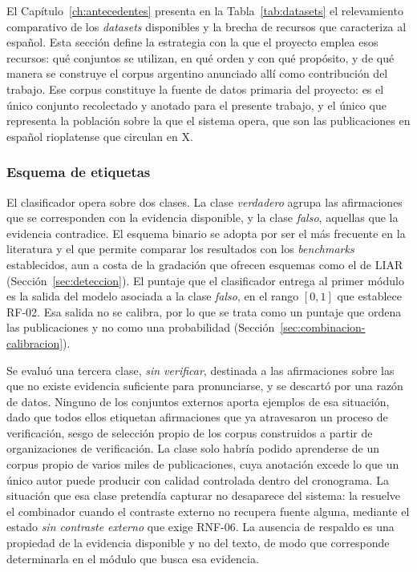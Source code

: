 El Capítulo~\ref{ch:antecedentes} presenta en la Tabla~\ref{tab:datasets} el relevamiento comparativo de los \textit{datasets} disponibles y la brecha de recursos que caracteriza al español. Esta sección define la estrategia con la que el proyecto emplea esos recursos: qué conjuntos se utilizan, en qué orden y con qué propósito, y de qué manera se construye el corpus argentino anunciado allí como contribución del trabajo. Ese corpus constituye la fuente de datos primaria del proyecto: es el único conjunto recolectado y anotado para el presente trabajo, y el único que representa la población sobre la que el sistema opera, que son las publicaciones en español rioplatense que circulan en X.

\subsubsection{Esquema de etiquetas}

El clasificador opera sobre dos clases. La clase \textit{verdadero} agrupa las afirmaciones que se corresponden con la evidencia disponible, y la clase \textit{falso}, aquellas que la evidencia contradice. El esquema binario se adopta por ser el más frecuente en la literatura y el que permite comparar los resultados con los \textit{benchmarks} establecidos, aun a costa de la gradación que ofrecen esquemas como el de LIAR (Sección~\ref{sec:deteccion}). El puntaje que el clasificador entrega al primer módulo es la salida del modelo asociada a la clase \textit{falso}, en el rango $[0,1]$ que establece RF-02. Esa salida no se calibra, por lo que se trata como un puntaje que ordena las publicaciones y no como una probabilidad (Sección~\ref{sec:combinacion-calibracion}).

Se evaluó una tercera clase, \textit{sin verificar}, destinada a las afirmaciones sobre las que no existe evidencia suficiente para pronunciarse, y se descartó por una razón de datos. Ninguno de los conjuntos externos aporta ejemplos de esa situación, dado que todos ellos etiquetan afirmaciones que ya atravesaron un proceso de verificación, sesgo de selección propio de los corpus construidos a partir de organizaciones de verificación. La clase solo habría podido aprenderse de un corpus propio de varios miles de publicaciones, cuya anotación excede lo que un único autor puede producir con calidad controlada dentro del cronograma. La situación que esa clase pretendía capturar no desaparece del sistema: la resuelve el combinador cuando el contraste externo no recupera fuente alguna, mediante el estado \textit{sin contraste externo} que exige RNF-06. La ausencia de respaldo es una propiedad de la evidencia disponible y no del texto, de modo que corresponde determinarla en el módulo que busca esa evidencia.

